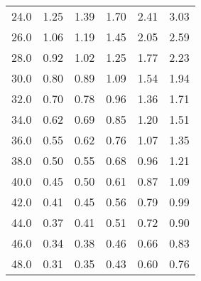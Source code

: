 \begin{tabular}{lrrrrr}
24.0 &                        1.25 &                        1.39 &                        1.70 &                        2.41 &                          3.03 \\
26.0 &                        1.06 &                        1.19 &                        1.45 &                        2.05 &                          2.59 \\
28.0 &                        0.92 &                        1.02 &                        1.25 &                        1.77 &                          2.23 \\
30.0 &                        0.80 &                        0.89 &                        1.09 &                        1.54 &                          1.94 \\
32.0 &                        0.70 &                        0.78 &                        0.96 &                        1.36 &                          1.71 \\
34.0 &                        0.62 &                        0.69 &                        0.85 &                        1.20 &                          1.51 \\
36.0 &                        0.55 &                        0.62 &                        0.76 &                        1.07 &                          1.35 \\
38.0 &                        0.50 &                        0.55 &                        0.68 &                        0.96 &                          1.21 \\
40.0 &                        0.45 &                        0.50 &                        0.61 &                        0.87 &                          1.09 \\
42.0 &                        0.41 &                        0.45 &                        0.56 &                        0.79 &                          0.99 \\
44.0 &                        0.37 &                        0.41 &                        0.51 &                        0.72 &                          0.90 \\
46.0 &                        0.34 &                        0.38 &                        0.46 &                        0.66 &                          0.83 \\
48.0 &                        0.31 &                        0.35 &                        0.43 &                        0.60 &                          0.76 \\

\end{tabular}
